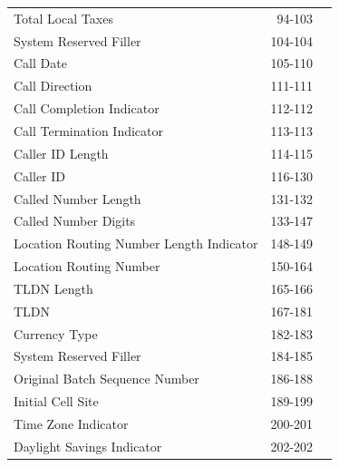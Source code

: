 \documentclass[12pt,twoside]{article}
\begin{document}
\begin{longtable}{lrr}
 Total Local Taxes                         &             94-103  &                        \\
 System Reserved Filler                    &            104-104  &                        \\
 Call Date                                 &            105-110  &                        \\
 Call Direction                            &            111-111  &                        \\
 Call Completion Indicator                 &            112-112  &                        \\
 Call Termination Indicator                &            113-113  &                        \\
 Caller ID Length                          &            114-115  &                        \\
 Caller ID                                 &            116-130  &                        \\
 Called Number Length                      &            131-132  &                        \\
 Called Number Digits                      &            133-147  &                        \\
 Location Routing Number Length Indicator  &            148-149  &                        \\
 Location Routing Number                   &            150-164  &                        \\
 TLDN Length                               &            165-166  &                        \\
 TLDN                                      &            167-181  &                        \\
 Currency Type                             &            182-183  &                        \\
 System Reserved Filler                    &            184-185  &                        \\
 Original Batch Sequence Number            &            186-188  &                        \\
 Initial Cell Site                         &            189-199  &                        \\
 Time Zone Indicator                       &            200-201  &                        \\
 Daylight Savings Indicator                &            202-202  &                        \\

\end{longtable}
\end{document}

